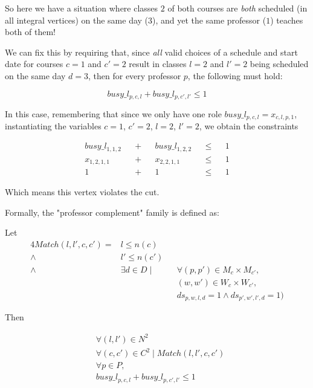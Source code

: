 So here we have a situation where classes $2$ of both courses are \emph{both} scheduled (in all integral vertices) on the same day ($3$), and yet the same professor ($1$) teaches both of them!

We can fix this by requiring that, since \emph{all} valid choices of a schedule and start date for courses $c = 1$ and $c' = 2$ result in classes $l = 2$ and $l' = 2$ being scheduled on the same day $d = 3$, then for every professor $p$, the following must hold:

$$
busy\_l_{p, c, l} + busy\_l_{p, c', l'} \le 1
$$

In this case, remembering that since we only have one role $busy\_l_{p, c, l} = x_{c, l, p, 1}$, instantiating the variables $c = 1$, $c' = 2$, $l = 2$, $l' = 2$, we obtain the constraints

\begin{align*}
&busy\_l_{1, 1, 2}& &+& &busy\_l_{1, 2, 2}& &\le& &1&\\
&x_{1, 2, 1, 1}& &+& &x_{2, 2, 1, 1}& &\le& &1&\\
&1& &+& &1& &\le& &1&
\end{align*}

Which means this vertex violates the cut.

Formally, the "professor complement" family is defined as:

Let
\begin{alignat*}{4}
Match(l, l', c, c') = &l \le n(c)\\
                      \land &l' \le n(c') \\
                      \land &\exists d \in D \mid &&\forall (p, p') \in M_c \times M_{c'},\\
                      &                           &&(w, w') \in W_c \times W_{c'},\\
                      &                           &&ds_{p, w, l, d} = 1 \land ds_{p', w', l', d} = 1)
\end{alignat*}

Then

\begin{align*}
&\forall (l, l') \in N^2\\
&\forall (c, c') \in C^2 \mid Match(l, l', c, c')\\
&\forall p \in P,\\
&busy\_l_{p, c, l} + busy\_l_{p, c', l'} \le 1
\end{align*}
